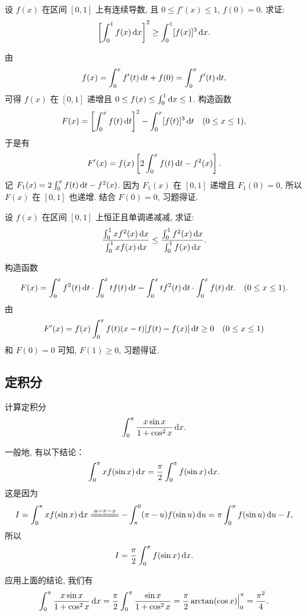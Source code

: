 \begin{exercise}[构造变上限积分]
    设 $f(x)$ 在区间 $[0, 1]$ 上有连续导数, 且 $0 \le f'(x) \le 1$, $f(0) = 0$. 求证:
    \[
    \sbr[3]{\int_0^1 f(x) \dx}^2 
    \ge 
    \int_0^1 [f(x)]^3 \dx.
    \]
\end{exercise}

\begin{solution}
    由
    \[
    f(x) = \int_0^x f'(t) \mathop{}\!\mathrm{d} t + f(0) = \int_0^x f'(t) \mathop{}\!\mathrm{d} t,
    \]
    可得 $f(x)$ 在 $[0, 1]$ 递增且 $0 \le f(x) \le \int_0^1 \mathop{}\!\mathrm{d} x \le 1$. 构造函数
    \[
    F(x) = \sbr[3]{\int_0^x f(t) \dt}^2 - \int_0^x [f(t)]^3 \dt 
    \quad 
    (0 \le x \le 1),
    \]
    于是有
    \[
    F'(x) = f(x) \sbr[3]{2 \int_0^x f(t) \dt - f^2(x)}.
    \]
    记 $F_1(x) = 2 \int_0^x f(t) \mathop{}\!\mathrm{d} t - f^2(x)$. 因为 $F_1(x)$ 在 $[0, 1]$ 递增且 $F_1(0) = 0$, 所以 $F(x)$ 在 $[0, 1]$ 也递增. 结合 $F(0) = 0$, 习题得证. 
\end{solution}

\begin{exercise}[构造变上限积分]
    设 $f(x)$ 在区间 $[0, 1]$ 上恒正且单调递减减, 求证:
    \[
    \frac{\int_0^1 xf^2(x) \mathop{}\!\mathrm{d} x}{\int_0^1 xf(x) \mathop{}\!\mathrm{d} x}
    \le
    \frac{\int_0^1 f^2(x) \mathop{}\!\mathrm{d} x}{\int_0^1 f(x) \mathop{}\!\mathrm{d} x}.
    \]
\end{exercise}

\begin{solution}
    构造函数
    \[
    F(x) = \int_0^x f^2(t) \mathop{}\!\mathrm{d} t \cdot \int_0^x tf(t) \mathop{}\!\mathrm{d} t
    - \int_0^x tf^2(t) \mathop{}\!\mathrm{d} t \cdot \int_0^x f(t) \mathop{}\!\mathrm{d} t. 
    \quad 
    (0 \le x \le 1).
    \]
    由
    \[
    F'(x) = f(x) \int_0^x f(t) (x - t) [f(t) - f(x)] \mathop{}\!\mathrm{d} t \ge 0 \quad (0 \le x \le 1)
    \]
    和 $F(0) = 0$ 可知, $F(1) \ge 0$, 习题得证.
\end{solution}

\subsection{定积分}
\begin{exercise}
    计算定积分
    \[
        \int_0^\pi \frac{x\sin x}{1+\cos^2 x} \mathop{}\!\mathrm{d} x.
    \]
\end{exercise}

\begin{solution}
    一般地, 有以下结论：
    \[
        \int_0^\pi x f(\sin x) \mathop{}\!\mathrm{d} x = \frac \pi2 \int_0^\pi f(\sin x) \mathop{}\!\mathrm{d} x.
    \]
    这是因为
    \[
        I = \int_0^\pi x f(\sin x) \dx
        \xlongequal{u=\pi-x} -\int_\pi^0 (\pi-u)f(\sin u) \dif u
        = \pi \int_0^\pi f(\sin u) \dif u - I,
    \]
    所以
    \[
        I = \frac \pi2 \int_0^\pi f(\sin x) \mathop{}\!\mathrm{d} x.
    \]
    
    应用上面的结论, 我们有
    \[
        \int_0^\pi \frac{x\sin x}{1+\cos^2 x} \dx 
        = \frac \pi2 \int_0^\pi \frac{\sin x}{1+\cos^2 x} 
        = \frac \pi2 \eval[2]{\arctan(\cos x)}_0^\pi 
        = \frac{\pi^2}{4}.
    \]
%    
\end{solution}

